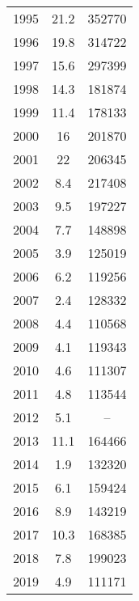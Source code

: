 \documentclass[11pt]{book}
\begin{document}
\begin{longtable}[t]{ccc}
1995 & 21.2 & 352770\\
1996 & 19.8 & 314722\\
1997 & 15.6 & 297399\\
1998 & 14.3 & 181874\\
1999 & 11.4 & 178133\\
2000 & 16 & 201870\\
2001 & 22 & 206345\\
2002 & 8.4 & 217408\\
2003 & 9.5 & 197227\\
2004 & 7.7 & 148898\\
2005 & 3.9 & 125019\\
2006 & 6.2 & 119256\\
2007 & 2.4 & 128332\\
2008 & 4.4 & 110568\\
2009 & 4.1 & 119343\\
2010 & 4.6 & 111307\\
2011 & 4.8 & 113544\\
2012 & 5.1 & --\\
2013 & 11.1 & 164466\\
2014 & 1.9 & 132320\\
2015 & 6.1 & 159424\\
2016 & 8.9 & 143219\\
2017 & 10.3 & 168385\\
2018 & 7.8 & 199023\\
2019 & 4.9 & 111171\\
\bottomrule
\end{longtable}
\clearpage
\end{document}
